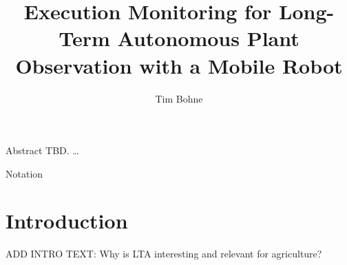 \documentclass[english, master, utf8]{base/thesis_KBS}
\begin{document}
\title{Execution Monitoring for Long-Term Autonomous Plant Observation with a Mobile Robot}
\author{Tim Bohne}

\generatetitle

\cleardoublepage

\begin{prefacesection}{Abstract}
TBD. \dots
\end{prefacesection}

\pagebreak

\begin{prefacesection}{Notation}
    \begin{figure}[H]
        \centering
    \end{figure}
\end{prefacesection}

\cleardoublepage
\tableofcontents

\startTextChapters %

\chapter{Introduction}

ADD INTRO TEXT: Why is LTA interesting and relevant for agriculture?\newline
\end{document}
